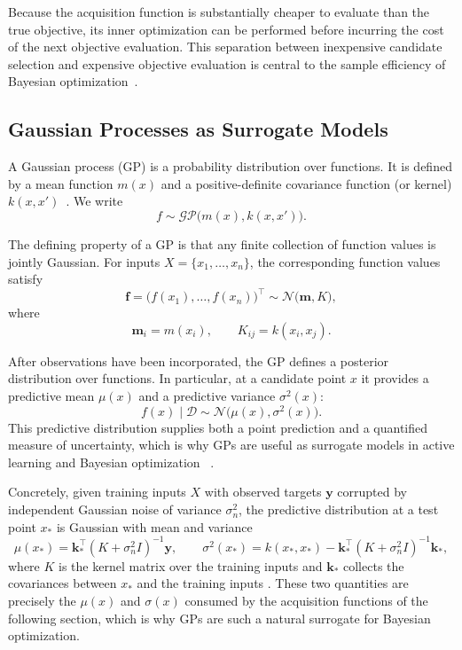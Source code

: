 \documentclass[12pt,a4paper]{report}
\begin{document}
        Because the acquisition function is substantially cheaper to evaluate than the true objective, its inner optimization can be performed before incurring the cost of the next objective evaluation. This separation between inexpensive candidate selection and expensive objective evaluation is central to the sample efficiency of Bayesian optimization~\cite{snoek2012practical,di2024active,balandat2019botorch}.

        \subsection{Gaussian Processes as Surrogate Models}
        A Gaussian process (GP) is a probability distribution over functions. It is
        defined by a mean function $m(x)$ and a positive-definite covariance function
        (or kernel) $k(x,x')$~\cite{williams1995gaussian,rasmussen2010gaussian}. We write
        \[
            f \sim \mathcal{GP}\bigl(m(x), k(x,x')\bigr).
        \]

        The defining property of a GP is that any finite collection of function
        values is jointly Gaussian. For inputs
        $X = \{x_1,\ldots,x_n\}$, the corresponding function values satisfy
        \[
            \mathbf{f}
            =
            \bigl(f(x_1),\ldots,f(x_n)\bigr)^\top
            \sim
            \mathcal{N}\bigl(\mathbf{m},K\bigr),
        \]
        where
        \[
            \mathbf{m}_i = m(x_i),
            \qquad
            K_{ij} = k(x_i,x_j).
        \]

        After observations have been incorporated, the GP defines a posterior
        distribution over functions. In particular, at a candidate point $x$ it
        provides a predictive mean $\mu(x)$ and a predictive variance
        $\sigma^2(x)$:
        \[
            f(x)\mid\mathcal{D}
            \sim
            \mathcal{N}\bigl(\mu(x),\sigma^2(x)\bigr).
        \]
        This predictive distribution supplies both a point prediction and a
        quantified measure of uncertainty, which is why GPs are useful as surrogate
        models in active learning and Bayesian optimization
        ~\cite{williams1995gaussian,rasmussen2010gaussian}.

        Concretely, given training inputs $X$ with observed targets $\mathbf{y}$ corrupted by independent Gaussian noise of variance $\sigma_n^2$, the predictive distribution at a test point $x_\ast$ is Gaussian with mean and variance
        \[
        \mu(x_\ast) = \mathbf{k}_\ast^{\top}\left(K + \sigma_n^2 I\right)^{-1}\mathbf{y}, \qquad
        \sigma^2(x_\ast) = k(x_\ast, x_\ast) - \mathbf{k}_\ast^{\top}\left(K + \sigma_n^2 I\right)^{-1}\mathbf{k}_\ast,
        \]
        where $K$ is the kernel matrix over the training inputs and $\mathbf{k}_\ast$ collects the covariances between $x_\ast$ and the training inputs \cite{williams1995gaussian,rasmussen2010gaussian}. These two quantities are precisely the $\mu(x)$ and $\sigma(x)$ consumed by the acquisition functions of the following section, which is why GPs are such a natural surrogate for Bayesian optimization.
\end{document}
